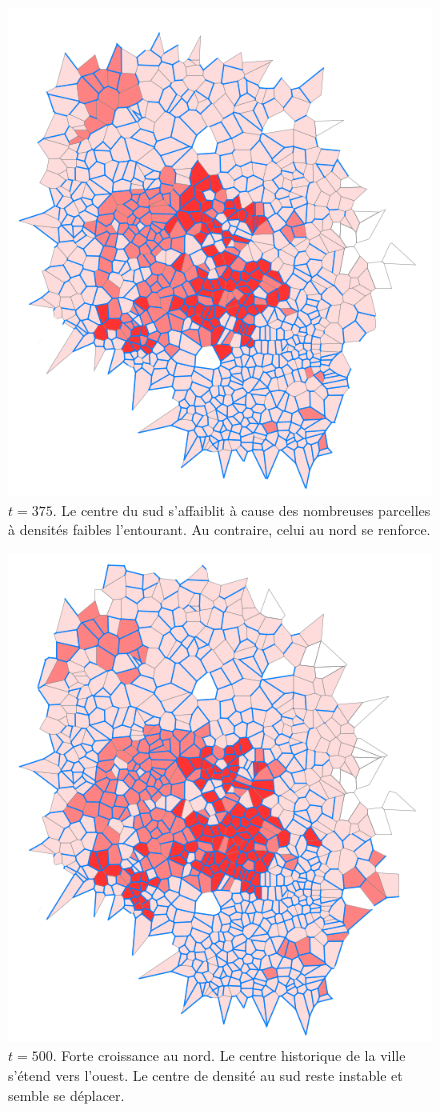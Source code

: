 \documentclass[10pt]{article}
\begin{document}
\begin{figure}[H]
  \centering
  \includegraphics[width=.8\linewidth]{images/lh_375.png}
  \caption{$t = 375$. Le centre du sud s'affaiblit à cause des
    nombreuses parcelles à densités faibles l'entourant. Au
    contraire, celui au nord se renforce.}
    \label{fig:lh_375}
\end{figure}

\begin{figure}[H]
  \centering
  \includegraphics[width=.8\linewidth]{images/lh_500.png}
  \caption{$t = 500$. Forte croissance au nord. Le centre historique
    de la ville s'étend vers l'ouest. Le centre de densité au sud
    reste instable et semble se déplacer.}
    \label{fig:lh_500}
\end{figure}
\end{document}
